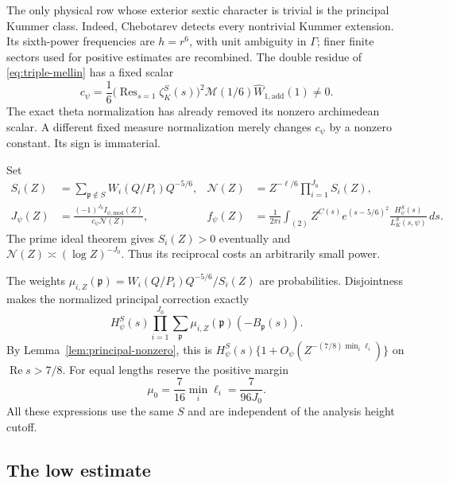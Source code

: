 \documentclass[11pt,a4paper]{article}
\numberwithin{equation}{section}
\theoremstyle{definition}
\theoremstyle{remark}
\newcommand{\Rea}{\operatorname{Re}}
\newcommand{\Res}{\operatorname{Res}}
\begin{document}
The only physical row whose exterior sextic character is trivial is the
principal Kummer class.  Indeed, Chebotarev detects every nontrivial Kummer
extension.  Its sixth-power frequencies are $h=r^6$, with unit ambiguity
in $\Gamma$; finer finite sectors used for positive estimates are recombined.
The double residue of \eqref{eq:triple-mellin} has a fixed scalar
\begin{equation}\label{eq:residue-c}
 c_\psi=\frac16\bigl(\Res_{s=1}\zeta_K^S(s)\bigr)^2
                  \mathcal M(1/6)\widehat W_{1,\mathrm{add}}(1)\ne0.
\end{equation}
The exact theta normalization has already removed its nonzero
archimedean scalar.  A different fixed measure normalization merely changes
$c_\psi$ by a nonzero constant.  Its sign is immaterial.

Set
\begin{align}
 S_i(Z)&=\sum_{\mathfrak p\notin S}W_i(Q/P_i)Q^{-5/6},&
 \mathcal N(Z)&=Z^{-\ell/6}\prod_{i=1}^{J_0}S_i(Z),
 \label{eq:positive-N}\\
 J_\psi(Z)&=\frac{(-1)^{J_0}I_{\psi,\mathrm{mod}}(Z)}{c_\psi\mathcal N(Z)},&
 f_\psi(Z)&=\frac1{2\pi i}\int_{(2)}
        Z^{C(s)}e^{(s-5/6)^2}
                  \frac{H_\psi^S(s)}{L_K^S(s,\psi)}\,ds.
 \label{eq:signal}
\end{align}
The prime ideal theorem gives
$S_i(Z)>0$ eventually and $\mathcal N(Z)\asymp(\log Z)^{-J_0}$.
Thus its reciprocal costs an arbitrarily small power.

The weights
$\mu_{i,Z}(\mathfrak p)=W_i(Q/P_i)Q^{-5/6}/S_i(Z)$ are probabilities.
Disjointness makes the normalized principal correction exactly
\[
 H_\psi^S(s)\prod_{i=1}^{J_0}
       \sum_{\mathfrak p}\mu_{i,Z}(\mathfrak p)(-B_{\mathfrak p}(s)).
\]
By Lemma~\ref{lem:principal-nonzero}, this is
$H_\psi^S(s)\{1+O_\psi(Z^{-(7/8)\min_i\ell_i})\}$ on $\Rea s>7/8$.
For equal lengths reserve the positive margin
\begin{equation}\label{eq:mu0}
 \mu_0=\frac7{16}\min_i\ell_i=\frac7{96J_0}.
\end{equation}
All these expressions use the same $S$ and are independent of the
analysis height cutoff.

\subsection{The low estimate}
\end{document}

